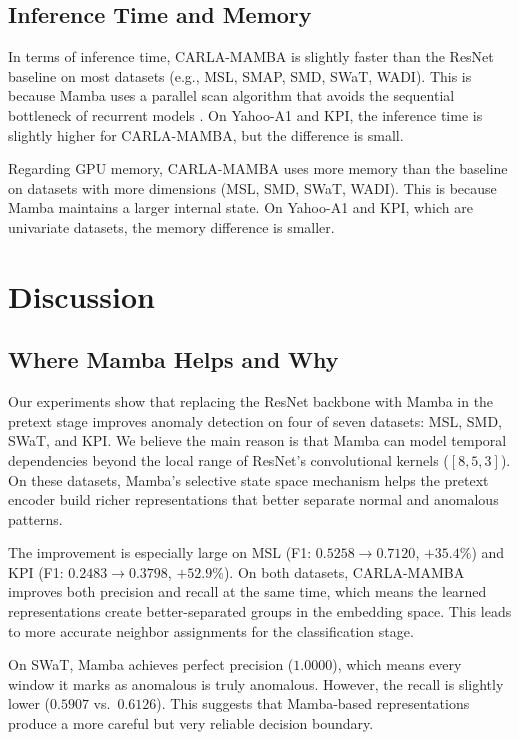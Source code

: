 \documentclass{svproc}
\begin{document}
\subsection{Inference Time and Memory}

In terms of inference time, CARLA-MAMBA is slightly faster than the ResNet baseline on most datasets (e.g., MSL, SMAP, SMD, SWaT, WADI). This is because Mamba uses a parallel scan algorithm that avoids the sequential bottleneck of recurrent models \cite{gu2023mamba}. On Yahoo-A1 and KPI, the inference time is slightly higher for CARLA-MAMBA, but the difference is small.

Regarding GPU memory, CARLA-MAMBA uses more memory than the baseline on datasets with more dimensions (MSL, SMD, SWaT, WADI). This is because Mamba maintains a larger internal state. On Yahoo-A1 and KPI, which are univariate datasets, the memory difference is smaller.

\section{Discussion}

\subsection{Where Mamba Helps and Why}

Our experiments show that replacing the ResNet backbone with Mamba in the pretext stage improves anomaly detection on four of seven datasets: MSL, SMD, SWaT, and KPI. We believe the main reason is that Mamba can model temporal dependencies beyond the local range of ResNet's convolutional kernels ($[8, 5, 3]$). On these datasets, Mamba's selective state space mechanism helps the pretext encoder build richer representations that better separate normal and anomalous patterns.

The improvement is especially large on MSL (F1: $0.5258 \to 0.7120$, $+35.4\%$) and KPI (F1: $0.2483 \to 0.3798$, $+52.9\%$). On both datasets, CARLA-MAMBA improves both precision and recall at the same time, which means the learned representations create better-separated groups in the embedding space. This leads to more accurate neighbor assignments for the classification stage.

On SWaT, Mamba achieves perfect precision ($1.0000$), which means every window it marks as anomalous is truly anomalous. However, the recall is slightly lower ($0.5907$ vs.\ $0.6126$). This suggests that Mamba-based representations produce a more careful but very reliable decision boundary.
\end{document}
